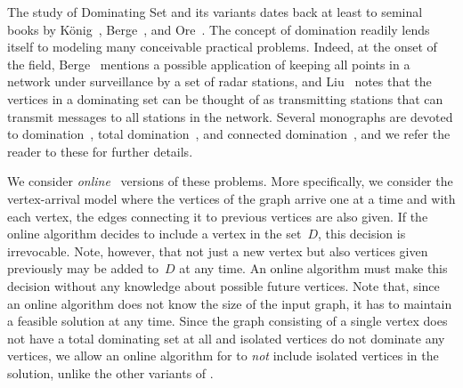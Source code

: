 The study of Dominating Set and its variants dates back at least to
seminal books by K\"{o}nig~\cite{K50}, Berge~\cite{B62}, and Ore~\cite{O62}.
The concept of domination readily lends itself to
modeling many conceivable practical problems.
Indeed, at the onset of the field,
Berge~\cite{B62} mentions a possible application of keeping all points in a
network under surveillance by a set of radar stations, and Liu~\cite{L68}
notes that the vertices in a dominating set can be thought
of as transmitting stations that can transmit messages to all stations
in the network. Several monographs are devoted to domination~\cite{HHS98},
total domination~\cite{HY13}, and connected domination~\cite{DW13}, and we
refer the reader to these for further details.

We consider \emph{online}~\cite{BE98b} versions of these problems.
More specifically, we consider the vertex-arrival model where the vertices
of the
graph arrive one at a time and with each vertex, the edges connecting
it to previous vertices are also given. 
If the online algorithm decides to include a vertex in the set~$D$,
this decision is irrevocable.
Note, however, that not just a new vertex but also vertices given
previously may be added to~$D$ at any time.
An online algorithm must make this decision without
any knowledge about possible future vertices.
Note that, since an online algorithm does not know the size of the
input graph, it has to maintain a feasible solution at any time.
Since the graph consisting of 
a single vertex does not have a total dominating set at all and
isolated vertices do not dominate any vertices, we allow an online 
algorithm for \tds to \emph{not} include isolated vertices in the solution, 
unlike the other variants of \ds.

